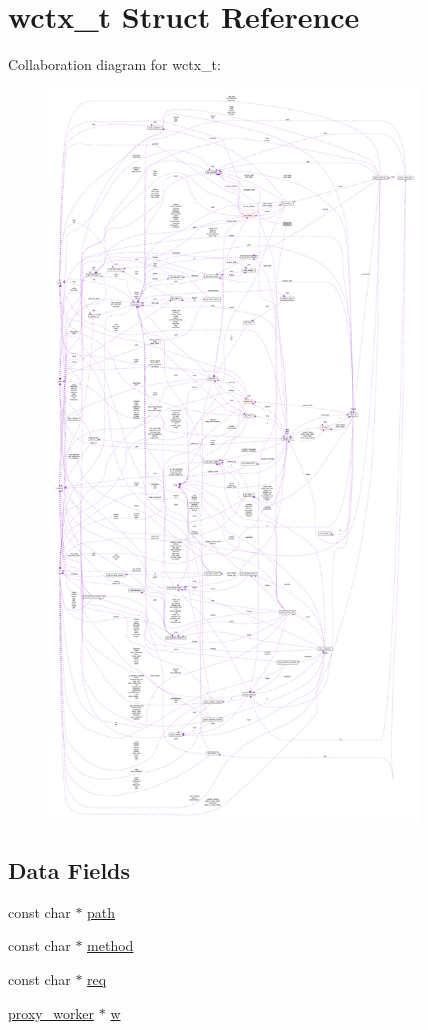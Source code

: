 \hypertarget{structwctx__t}{}\section{wctx\+\_\+t Struct Reference}
\label{structwctx__t}


Collaboration diagram for wctx\+\_\+t\+:
\nopagebreak
\begin{figure}[H]
\begin{center}
\leavevmode
\includegraphics[height=550pt]{structwctx__t__coll__graph}
\end{center}
\end{figure}
\subsection*{Data Fields}
\begin{DoxyCompactItemize}
\item 
const char $\ast$ \hyperlink{structwctx__t_a1d2c2b4236f67468dd07599efff0a1d3}{path}
\item 
const char $\ast$ \hyperlink{structwctx__t_a2b4042362c17c82892fa03bd23c4780d}{method}
\item 
const char $\ast$ \hyperlink{structwctx__t_ac991b4b9cbd27ff5d872121a096761f9}{req}
\item 
\hyperlink{structproxy__worker}{proxy\+\_\+worker} $\ast$ \hyperlink{structwctx__t_ae0bb78abcbcb81a638d1f94aaa63adc4}{w}
\end{DoxyCompactItemize}


